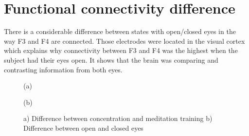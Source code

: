 \vspace*{4cm}

\section{Functional connectivity difference}
\par There is a considerable difference between states with open/closed eyes in the way F3 and F4 are connected. Those electrodes were located in the visual cortex which explains why connectivity between F3 and F4 was the highest when the subject had their eyes open. It shows that the brain was comparing and contrasting information from both eyes.

\begin{figure}[h!]
\begin{minipage}[h]{0.49\linewidth}
 (a) \\
\end{minipage}
\hfill
\begin{minipage}[h]{0.5\linewidth}
 (b) \\
\end{minipage}
\caption{a) Difference between concentration and meditation training b) Difference between open and closed eyes} 
\end{figure}


